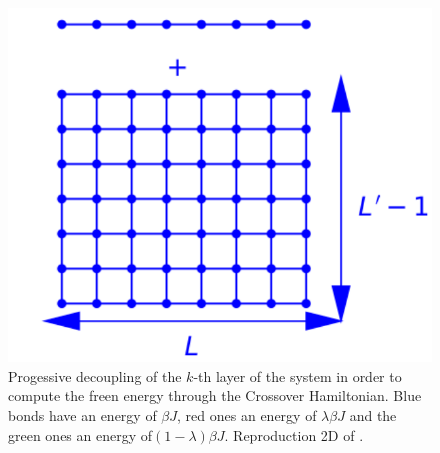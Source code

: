 \begin{figure}
\begin{minipage}[t]{0.32\linewidth}
\caption*{$H(\lambda)$} 
\end{minipage}
\centering
\begin{minipage}[t]{0.32\linewidth}
\includegraphics[width=\linewidth]{numerical/cross-h1.pdf}
\caption*{$H_1$}
\end{minipage}
\caption{Progessive decoupling of the $k$-th layer of the system in order to compute the freen energy through the Crossover Hamiltonian. Blue bonds have an energy of $\beta J$, red ones an energy of $\lambda \beta J $ and the green ones an energy of$ (1-\lambda) \beta J$. Reproduction 2D of \cite{ vasilyev_universal_2009}.}
\label{decouplage}
\end{figure}

